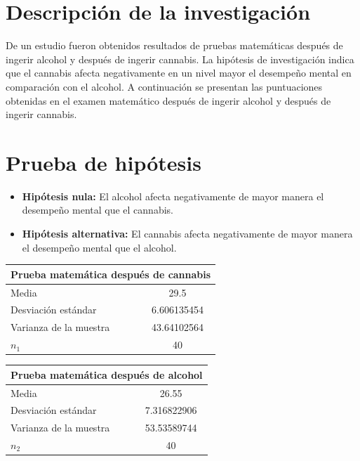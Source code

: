 \documentclass[a4paper]{report}
\begin{document}

\section{Descripción de la investigación}
De un estudio fueron obtenidos resultados de pruebas matemáticas después de ingerir alcohol y después de ingerir cannabis.
La hipótesis de investigación indica que el cannabis afecta negativamente en un nivel mayor el desempeño mental en comparación con el alcohol. A continuación se presentan las puntuaciones obtenidas en el examen matemático después de ingerir alcohol y después de ingerir cannabis.

\section{Prueba de hipótesis}

\begin{itemize}
    \item \textbf{Hipótesis nula:} El alcohol afecta negativamente de mayor manera el desempeño mental que el cannabis.
    \item \textbf{Hipótesis alternativa:} El cannabis afecta negativamente de mayor manera el desempeño mental que el alcohol.
\end{itemize}

\begin{center}
    {
        \begin{tabular}{ |l|c| }
            \hline
                \multicolumn{2}{|c|}{\textbf{Prueba matemática después de cannabis}} 
            \\ 
            \hline
                Media & 29.5 \\ 
            \hline
                Desviación estándar & 6.606135454 \\ 
            \hline
                Varianza de la muestra & 43.64102564 \\ 
            \hline
                $n_1$ & 40 \\ 
            \hline
        \end{tabular}
    }
    {
        \begin{tabular}{ |l|c| }
            \hline
                \multicolumn{2}{|c|}{\textbf{Prueba matemática después de alcohol}} 
            \\ 
            \hline
                Media & 26.55 \\ 
            \hline
                Desviación estándar & 7.316822906 \\ 
            \hline
                Varianza de la muestra & 53.53589744 \\ 
            \hline
                $n_2$ & 40 \\ 
            \hline
        \end{tabular}
    }
\end{center}
\end{document}
